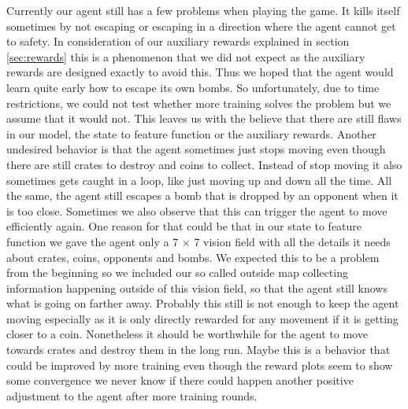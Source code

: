 Currently our agent still has a few problems when playing the game. It kills itself sometimes by not escaping or escaping in a direction where the agent cannot get to safety. In consideration of our auxiliary rewards explained in section \ref{sec:rewards} this is a phenomenon that we did not expect as the auxiliary rewards are designed exactly to avoid this. Thus we hoped that the agent would learn quite early how to escape its own bombs. So unfortunately, due to time restrictions, we could not test whether more training solves the problem but we assume that it would not. This leaves us with the believe that there are still flaws in our model, the state to feature function or the auxiliary rewards. Another undesired behavior is that the agent sometimes just stops moving even though there are still crates to destroy and coins to collect. Instead of stop moving it also sometimes gets caught in a loop, like just moving up and down all the time. All the same, the agent still escapes a bomb that is dropped by an opponent when it is too close. Sometimes we also observe that this can trigger the agent to move efficiently again. One reason for that could be that in our state to feature function we gave the agent only a 7 $\times$ 7 vision field with all the details it needs about crates, coins, opponents and bombs. We expected this to be a problem from the beginning so we included our so called outside map collecting information happening outside of this vision field, so that the agent still knows what is going on farther away. Probably this still is not enough to keep the agent moving especially as it is only directly rewarded for any movement if it is getting closer to a coin. Nonetheless it should be worthwhile for the agent to move towards crates and destroy them in the long run. Maybe this is a behavior that could be improved by more training even though the reward plots seem to show some convergence we never know if there could happen another positive adjustment to the agent after more training rounds.
